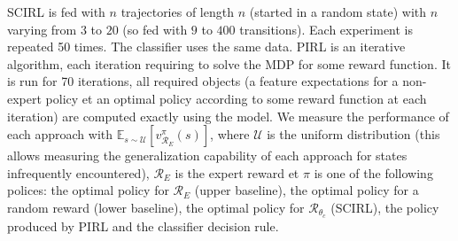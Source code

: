 \documentclass[english,utf8]{./hermes-journal}
\newcommand{\R}{\mathcal{R}}
\newcommand{\E}{\mathbb{E}}
\begin{document}
SCIRL is fed with $n$ trajectories of length $n$ (started in a
random state) with $n$ varying from $3$ to $20$ (so fed with $9$ to
$400$ transitions). Each experiment is repeated 50 times. The
 classifier uses the same data. PIRL is an iterative
algorithm, each iteration requiring to solve the MDP for some reward
function. It is run for 70 iterations, all required objects (a
feature expectations for a non-expert policy et an optimal policy
according to some reward function at each iteration) are computed
exactly using the model. We measure the performance of each approach
with $\E_{s\sim \mathcal{U}}[v^\pi_{\R_E}(s)]$, where $\mathcal{U}$
is the uniform distribution (this allows measuring the
generalization capability of each approach for states infrequently
encountered), $\R_E$ is the expert reward et $\pi$ is one of the
following polices: the optimal policy for $\R_E$ (upper baseline),
the optimal policy for a random reward (lower baseline), the optimal
policy for $\R_{\theta_c}$ (SCIRL), the policy produced by PIRL and
the classifier decision rule.
\end{document}
